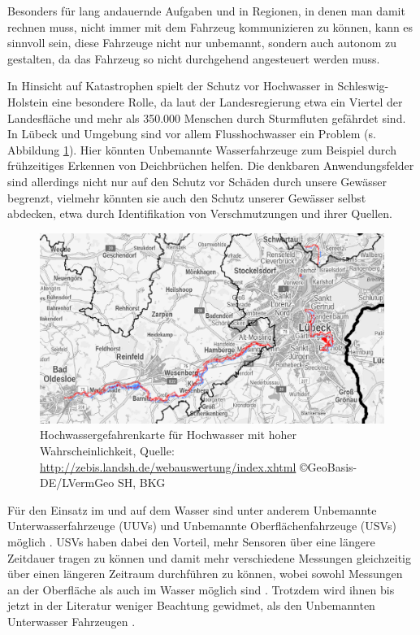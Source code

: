 \documentclass[11pt]{article}
\begin{document}
Besonders für lang andauernde Aufgaben und in Regionen, in denen man damit rechnen muss, nicht immer mit dem Fahrzeug kommunizieren zu können, kann es sinnvoll sein, diese Fahrzeuge nicht nur unbemannt, sondern auch autonom zu gestalten, da das Fahrzeug so nicht durchgehend angesteuert werden muss.

In Hinsicht auf Katastrophen spielt der Schutz vor Hochwasser in Schleswig-Holstein eine besondere Rolle, da laut der Landesregierung etwa ein Viertel der Landesfläche und mehr als 350.000 Menschen durch Sturmfluten gefährdet sind\cite{Hochwasser}. In Lübeck und Umgebung sind vor allem Flusshochwasser ein Problem (s. Abbildung \ref{Hochwassergefahrenkarte}). Hier könnten Unbemannte Wasserfahrzeuge zum Beispiel durch frühzeitiges Erkennen von Deichbrüchen helfen. Die denkbaren Anwendungsfelder sind allerdings nicht nur auf den Schutz vor Schäden durch unsere Gewässer begrenzt, vielmehr könnten sie auch den Schutz unserer Gewässer selbst abdecken, etwa durch Identifikation von Verschmutzungen und ihrer Quellen.

\begin{figure}
	\centering
	\includegraphics[width=0.8\linewidth]{Hochwasserrisiko.png}
	\caption{Hochwassergefahrenkarte für Hochwasser mit hoher Wahrscheinlichkeit, Quelle: \protect\url{http://zebis.landsh.de/webauswertung/index.xhtml} ©GeoBasis-DE/LVermGeo SH, BKG}
	\label{Hochwassergefahrenkarte}
\end{figure}

Für den Einsatz im und auf dem Wasser sind unter anderem Unbemannte Unterwasserfahrzeuge (UUVs) und Unbemannte Oberflächenfahrzeuge (USVs) möglich \cite{surveyDisasterRobotics}. USVs haben dabei den Vorteil, mehr Sensoren über eine längere Zeitdauer tragen zu können und damit mehr verschiedene Messungen gleichzeitig über einen längeren Zeitraum durchführen zu können, wobei sowohl Messungen an der Oberfläche als auch im Wasser möglich sind \cite{coley2015}. Trotzdem wird ihnen bis jetzt in der Literatur weniger Beachtung gewidmet, als den Unbemannten Unterwasser Fahrzeugen \cite{surveyDisasterRobotics}.
\end{document}
